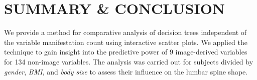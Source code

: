 \documentclass[a4paper,twoside]{style/article}
\begin{document}
\section{\uppercase{Summary \& Conclusion}}
\label{sec:Conclusion}
\noindent We provide a method for comparative analysis of decision trees independent of the variable manifestation count using interactive scatter plots.
We applied the technique to gain insight into the predictive power of 9 image-derived variables for 134 non-image variables.
The analysis was carried out for subjects divided by \emph{gender}, \emph{BMI}, and \emph{body size} to assess their influence on the lumbar spine shape.
\end{document}
